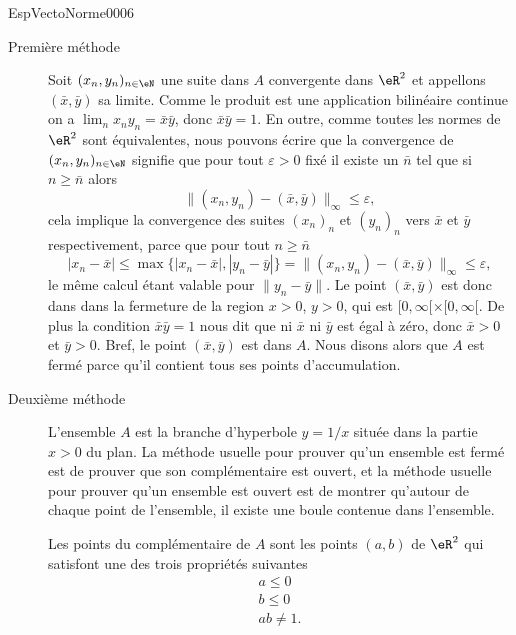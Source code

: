 \begin{corrige}{EspVectoNorme0006}

  \begin{description}
    \item[Première méthode]  Soit $(x_n, y_n)_{n\in\eN}$ une suite dans $A$ convergente dans $\eR^2$  et appellons $(\bar x,\bar y)$ sa limite. Comme le produit est une application bilinéaire continue on a $\lim_{n} x_ny_n= \bar x \bar y$, donc $\bar x \bar y=1$. En outre, comme toutes les normes de $\eR^2$ sont équivalentes, nous pouvons écrire que la convergence de $(x_n, y_n)_{n\in\eN}$ signifie que pour tout $\varepsilon>0$ fixé il existe un $\bar n$ tel que si $n\geq \bar n$ alors  
\begin{equation}
  \|(x_n, y_n)-(\bar x, \bar y)\|_\infty\leq \varepsilon,
\end{equation}
cela implique la convergence des suites $(x_n)_n$ et $(y_n)_n$ vers $\bar x$ et $\bar y$ respectivement, parce que pour tout $n\geq \bar n$
\begin{equation}
 |x_n-\bar x|\leq \max\{|x_n-\bar x|,|y_n-\bar y| \}= \|(x_n, y_n)-(\bar x, \bar y)\|_\infty\leq \varepsilon,
\end{equation} 
le même calcul étant valable pour $\|y_n-\bar y\|$. Le point $(\bar x,\bar y)$ est donc dans dans la fermeture de la region $x>0$, $y>0$, qui est $[0,\infty[\times [0,\infty[$. De plus la condition $\bar x \bar y=1$ nous dit que ni $\bar x$ ni $\bar y$ est égal à zéro, donc $\bar x>0$ et $\bar y>0$. Bref, le point  $(\bar x, \bar y)$ est dans $A$. Nous disons alors que $A$ est fermé parce qu'il contient tous ses points d'accumulation.  
 \item[Deuxième méthode] L'ensemble $A$ est la branche d'hyperbole $y=1/x$ située dans la partie $x>0$ du plan. La méthode usuelle pour prouver qu'un ensemble est fermé est de prouver que son complémentaire est ouvert, et la méthode usuelle pour prouver qu'un ensemble est ouvert est de montrer qu'autour de chaque point de l'ensemble, il existe une boule contenue dans l'ensemble.

	Les points du complémentaire de $A$ sont les points $(a,b)$ de $\eR^2$ qui satisfont une des trois propriétés suivantes
	\begin{subequations}
		\begin{align}
			a\leq 0\\
			b\leq 0\\
			ab\neq 1		\label{subEqxyneq106}.
		\end{align}
	\end{subequations}


\end{description}
\end{corrige}
